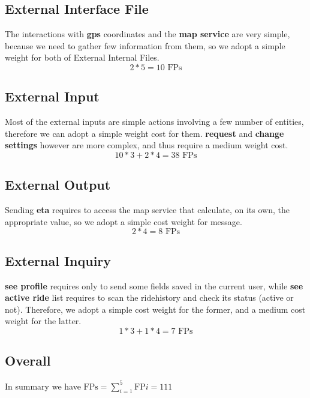   \subsection{External Interface File}
  The interactions with \textbf{gps} coordinates and the \textbf{map service} are very simple, 
  because we need to gather few information from them, so we adopt a simple weight for
  both of External Internal Files.
  \begin{equation}
   2*5 = 10 \text{ FPs}
  \end{equation}
  
  \subsection{External Input}
  Most of the external inputs are simple actions involving a few number of entities,
  therefore we can adopt a simple weight cost for them.
  \textbf{request} and \textbf{change settings} however are more complex, and thus require a medium weight cost.
  \begin{equation}
    10*3 + 2*4= 38 \text{ FPs}
  \end{equation}
  
  \subsection{External Output}
  Sending \textbf{eta} requires to access the map service that calculate, on its own,
  the appropriate value, so we adopt a simple cost weight for message.
  \begin{equation}
    2*4 = 8 \text{ FPs}
  \end{equation}
  
  \subsection{External Inquiry}
  \textbf{see profile} requires only to send some fields saved in the current user,
  while \textbf{see active ride} list requires to scan the ridehistory and check its status (active or not).
  Therefore, we adopt a simple cost weight for the former, and a medium cost weight for the latter.
  \begin{equation}
    1*3 + 1*4 = 7 \text{ FPs}
  \end{equation}
  
  \subsection{Overall}
  In summary we have $\text{FPs} = \sum_{i=1}^{5} \text{FP}i = 111 $
 